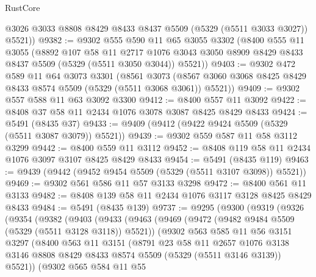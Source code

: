 \begin{lexlean}{RustCore}
\begin{coremodule}
        @3026
        @3033
        @8808
        @8429
        @8433
        @8437
        @5509
        (@5329 (@5511 @3033 @3027))
        @5521))
@9382 := @9302
    @555
    @590
    @11
    @65
    @3055
    @3302
    (@8400
      @555
      @11
      @3055
      (@8892
        @107
        @58
        @11
        @2717
        @1076
        @3043
        @3050
        @8909
        @8429
        @8433
        @8437
        @5509
        (@5329 (@5511 @3050 @3044))
        @5521))
@9403 := @9302
    @472
    @589
    @11
    @64
    @3073
    @3301
    (@8561
      @3073
      (@8567 @3060 @3068 @8425 @8429 @8433 @8574 @5509 (@5329 (@5511 @3068 @3061)) @5521))
@9409 := @9302 @557 @588 @11 @63 @3092 @3300
@9412 := @8400 @557 @11 @3092
@9422 := @8408 @37 @58 @11 @2434 @1076 @3078 @3087 @8425 @8429 @8433
@9424 := @5491 (@8435 @37)
@9433 := @9409 (@9412 (@9422 @9424 @5509 (@5329 (@5511 @3087 @3079)) @5521))
@9439 := @9302 @559 @587 @11 @58 @3112 @3299
@9442 := @8400 @559 @11 @3112
@9452 := @8408 @119 @58 @11 @2434 @1076 @3097 @3107 @8425 @8429 @8433
@9454 := @5491 (@8435 @119)
@9463 := @9439 (@9442 (@9452 @9454 @5509 (@5329 (@5511 @3107 @3098)) @5521))
@9469 := @9302 @561 @586 @11 @57 @3133 @3298
@9472 := @8400 @561 @11 @3133
@9482 := @8408 @139 @58 @11 @2434 @1076 @3117 @3128 @8425 @8429 @8433
@9484 := @5491 (@8435 @139)
@9737 := @9295
    (@9300
      (@9319
        (@9326
          (@9354
            (@9382
              (@9403
                (@9433
                  (@9463
                    (@9469
                      (@9472 (@9482 @9484 @5509 (@5329 (@5511 @3128 @3118)) @5521))
                      (@9302
                        @563
                        @585
                        @11
                        @56
                        @3151
                        @3297
                        (@8400
                          @563
                          @11
                          @3151
                          (@8791
                            @23
                            @58
                            @11
                            @2657
                            @1076
                            @3138
                            @3146
                            @8808
                            @8429
                            @8433
                            @8574
                            @5509
                            (@5329 (@5511 @3146 @3139))
                            @5521))
                        (@9302
                          @565
                          @584
                          @11
                          @55

\end{coremodule}
\end{lexlean}
